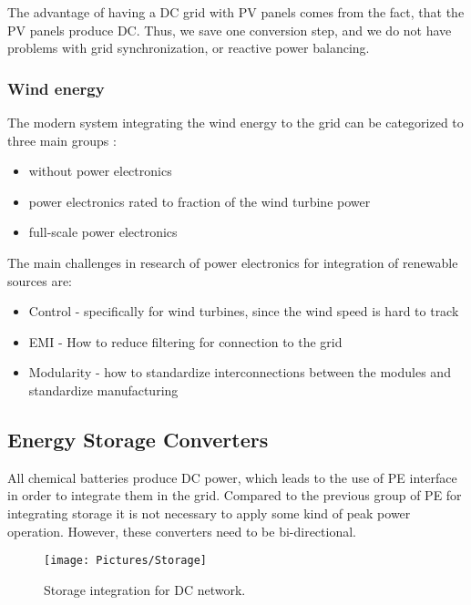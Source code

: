 \documentclass[]{scrartcl}
\begin{document}
The advantage of having a DC grid with PV panels comes from the fact, that the PV panels produce DC. Thus, we save one conversion step, and we do not have problems with grid synchronization, or reactive power balancing. 


\subsubsection{Wind energy}


The modern system integrating the wind energy to the grid can be categorized to three main groups \cite{Technology2015}:
\begin{itemize}
	\item without power electronics
	\item power electronics rated to fraction of the wind turbine power
	\item full-scale power electronics
\end{itemize}



The main challenges in research of power electronics for integration of renewable sources are: 
\begin{itemize}
	\item Control - specifically for wind turbines, since the wind speed is hard to track
	\item EMI - How to reduce filtering for connection to the grid
	\item Modularity - how to standardize interconnections between the modules and standardize manufacturing
\end{itemize}



\subsection{Energy Storage Converters}

All chemical batteries produce DC power, which leads to the use of PE interface in order to integrate them in the grid. Compared to the previous group of PE for integrating storage it is not necessary to apply some kind of peak power operation. However, these converters need to be bi-directional.

\begin{figure}[h!]
	\centering
	\texttt{[image: Pictures/Storage]}
	\caption{Storage integration for DC network.}
	\label{fig:Storage}
\end{figure}
\end{document}
